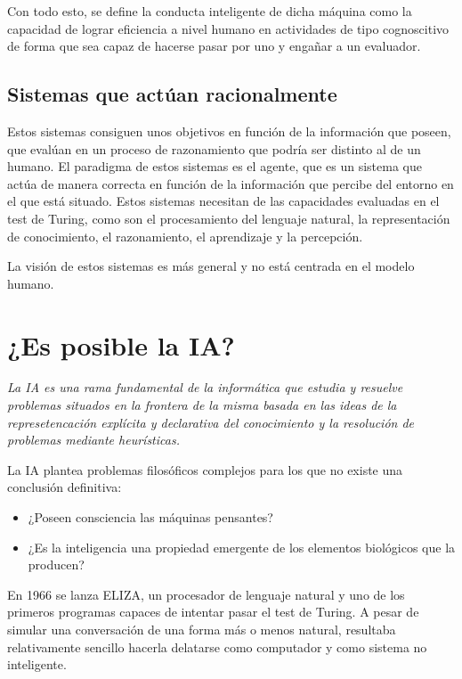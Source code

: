 Con todo esto, se define la conducta inteligente de dicha máquina como la capacidad de lograr eficiencia a nivel humano en actividades de tipo cognoscitivo de forma que sea capaz de hacerse pasar por uno y engañar a un evaluador.

\subsection{Sistemas que actúan racionalmente}

Estos sistemas consiguen unos objetivos en función de la información que poseen, que evalúan en un proceso de razonamiento que podría ser distinto al de un humano.
El paradigma de estos sistemas es el agente, que es un sistema que actúa de manera correcta en función de la información que percibe del entorno en el que está situado.
Estos sistemas necesitan de las capacidades evaluadas en el test de Turing, como son el procesamiento del lenguaje natural, la representación de conocimiento, el razonamiento, el aprendizaje y la percepción.

La visión de estos sistemas es más general y no está centrada en el modelo humano.

\section{¿Es posible la IA?}

\begin{displayquote}
\textit{La IA es una rama fundamental de la informática que estudia y resuelve problemas situados en la frontera de la misma basada en las ideas de la represetencación explícita y declarativa del conocimiento y la resolución de problemas mediante heurísticas.}
\end{displayquote}

La IA plantea problemas filosóficos complejos para los que no existe una conclusión definitiva:

\begin{itemize}
	\item ¿Poseen consciencia las máquinas pensantes?
	\item ¿Es la inteligencia una propiedad emergente de los elementos biológicos que la producen?
\end{itemize}

En 1966 se lanza ELIZA, un procesador de lenguaje natural y uno de los primeros programas capaces de intentar pasar el test de Turing.
A pesar de simular una conversación de una forma más o menos natural, resultaba relativamente sencillo hacerla delatarse como computador y como sistema no inteligente.

